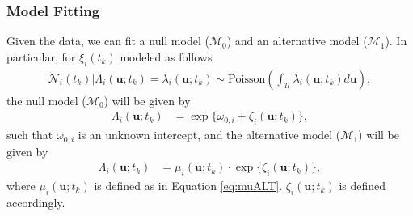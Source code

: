 \documentclass[12pt, aspectratio = 169]{beamer} %
\begin{document}
		\begin{frame}[t]
		\frametitle{Model Fitting}
		\justifying
		
		Given the data, we can fit a null model ($\mathcal{M}_0$) and an alternative model ($\mathcal{M}_1$). In particular, for $\xi_{i}(t_k)$ modeled as follows
		\begin{align*}
			\mathcal{N}_i(t_k)|\Lambda_i(\mathbf{u}; t_k) = \lambda_i(\mathbf{u}; t_k) \sim \text{Poisson}\left(\int_{\mathcal{U}}\lambda_i(\mathbf{u}; t_k)d\mathbf{u}\right),
		\end{align*}
		the null model ($\mathcal{M}_0$) will be given by
		\begin{align*}
			\Lambda_i(\mathbf{u}; t_k) &= \exp\{\omega_{0, i} + \zeta_i(\mathbf{u}; t_k)\}, 
		\end{align*}
		such that $\omega_{0, i}$ is an unknown intercept, and the alternative model ($\mathcal{M}_1$) will be given by
		\begin{align*}
			\Lambda_i(\mathbf{u}; t_k) &= \mu_{i}(\mathbf{u}; t_k) \cdot \exp\{\zeta_i(\mathbf{u}; t_k)\}, 
		\end{align*}
		where $\mu_{i}(\mathbf{u}; t_k)$ is defined as in Equation \eqref{eq:muALT}. $\zeta_i(\mathbf{u}; t_k)$ is defined accordingly.
	\end{frame}
	
%		
%		
	
\end{document}
